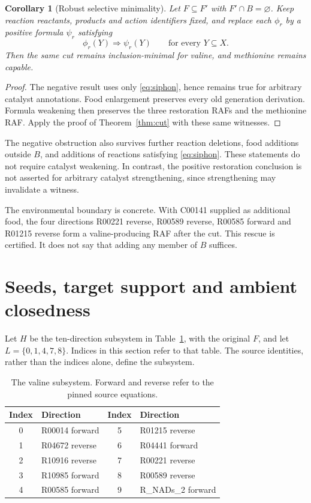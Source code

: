 \documentclass[11pt]{article}
\newtheorem{corollary}[theorem]{Corollary}
\theoremstyle{definition}\newtheorem{definition}[theorem]{Definition}
\begin{document}
\begin{corollary}[Robust selective minimality]\label{cor:robust}
Let $F\subseteq F'$ with $F'\cap B=\varnothing$. Keep reaction reactants, products and action identifiers fixed, and replace each $\phi_r$ by a positive formula $\psi_r$ satisfying
\[
 \phi_r(Y)\Longrightarrow\psi_r(Y)\qquad\text{for every }Y\subseteq X.
\]
Then the same cut remains inclusion-minimal for valine, and methionine remains capable.
\end{corollary}
\begin{proof}
The negative result uses only \eqref{eq:siphon}, hence remains true for arbitrary catalyst annotations. Food enlargement preserves every old generation derivation. Formula weakening then preserves the three restoration RAFs and the methionine RAF. Apply the proof of Theorem~\ref{thm:cut} with these same witnesses.
\end{proof}

The negative obstruction also survives further reaction deletions, food additions outside $B$, and additions of reactions satisfying \eqref{eq:siphon}. These statements do not require catalyst weakening. In contrast, the positive restoration conclusion is not asserted for arbitrary catalyst strengthening, since strengthening may invalidate a witness.

The environmental boundary is concrete. With C00141 supplied as additional food, the four directions R00221 reverse, R00589 reverse, R00585 forward and R01215 reverse form a valine-producing RAF after the cut. This rescue is certified. It does not say that adding any member of $B$ suffices.

\section{Seeds, target support and ambient closedness}
Let $H$ be the ten-direction subsystem in Table~\ref{tab:small}, with the original $F$, and let $L=\{0,1,4,7,8\}$. Indices in this section refer to that table. The source identities, rather than the indices alone, define the subsystem.

\begin{table}[tb]\centering
\caption{The valine subsystem. Forward and reverse refer to the pinned source equations.}\label{tab:small}
\begin{tabular}{clcl}\toprule
Index & Direction & Index & Direction\\\midrule
0 & R00014 forward & 5 & R01215 reverse\\
1 & R04672 reverse & 6 & R04441 forward\\
2 & R10916 reverse & 7 & R00221 reverse\\
3 & R10985 forward & 8 & R00589 reverse\\
4 & R00585 forward & 9 & R\_NADs\_2 forward\\\bottomrule
\end{tabular}\end{table}
\end{document}
